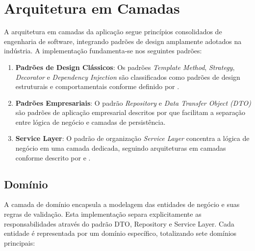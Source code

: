 \section{Arquitetura em Camadas}

\hspace{0.5cm} A arquitetura em camadas da aplicação segue princípios consolidados de engenharia de software,
integrando padrões de design amplamente adotados na indústria. A implementação fundamenta-se nos seguintes padrões:

\begin{enumerate}
  \item \textbf{Padrões de Design Clássicos}: Os padrões \textit{Template Method}, \textit{Strategy},
  \textit{Decorator} e \textit{Dependency Injection} são classificados como padrões de design estruturais
  e comportamentais conforme definido por \cite{gamma2009design}.

  \item \textbf{Padrões Empresariais}: O padrão \textit{Repository} e \textit{Data Transfer Object (DTO)}
  são padrões de aplicação empresarial descritos por \cite{fowler2015patterns} que facilitam a separação
  entre lógica de negócio e camadas de persistência.

  \item \textbf{Service Layer}: O padrão de organização \textit{Service Layer} concentra a lógica de negócio
  em uma camada dedicada, seguindo arquiteturas em camadas conforme descrito por \cite{fowler2015patterns}
  e \cite{evans2014domain}.
\end{enumerate}

\subsection{Domínio}

\hspace{0.5cm} A camada de domínio encapsula a modelagem das entidades de negócio e suas regras de validação.
Esta implementação separa explicitamente as responsabilidades através do padrão DTO, Repository e Service Layer.
Cada entidade é representada por um domínio específico, totalizando sete domínios principais:

